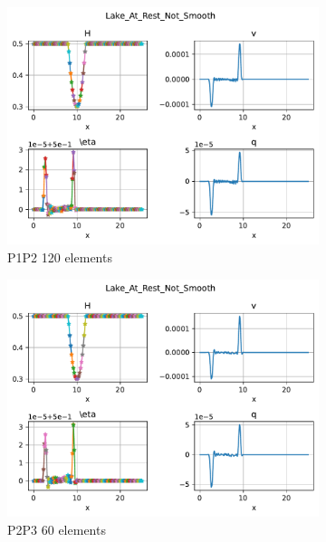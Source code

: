 \documentclass[english]{article}
\theoremstyle{thmstyleone}
\theoremstyle{thmstyletwo}
\theoremstyle{thmstylethree}
\begin{document}
\begin{figure}
\begin{subfigure}{0.45\textwidth}
	\end{subfigure}\\
	\begin{subfigure}{0.45\textwidth}
		\includegraphics[trim= 0 0 200 180, clip,width=\textwidth]{figures/LatRnS_P1P2_N_el00120.pdf}\caption{P1P2 120 elements}
	\end{subfigure}
	\begin{subfigure}{0.45\textwidth}
		\includegraphics[trim= 0 0 200 180, clip,width=\textwidth]{figures/LatRnS_P2P3_N_el00060.pdf}\caption{P2P3 60 elements}
	\end{subfigure}\\
	\begin{subfigure}{0.45\textwidth}

\end{subfigure}
\end{figure}
\end{document}
